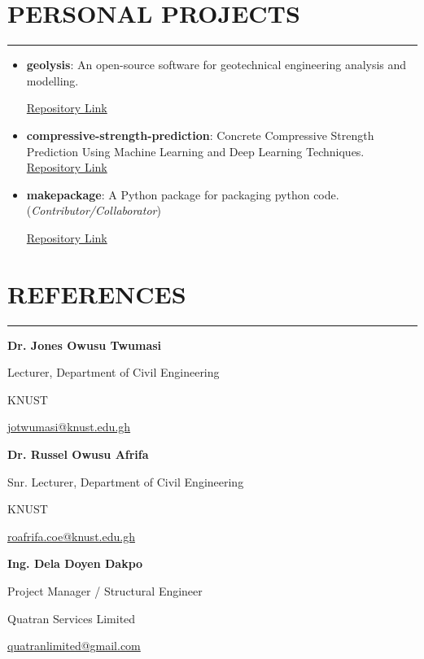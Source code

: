 \documentclass[letterpaper, 12pt]{article}
\newcommand{\cvsection}[1]{

	\section*{#1} \vspace*{-0.8cm}%
	\rule{\linewidth}{2pt}\par
}
\begin{document}

\cvsection{PERSONAL PROJECTS}

\begin{itemize}[leftmargin=*]

	\item \textbf{geolysis}: An open-source software for geotechnical engineering analysis and modelling. \par
	      \href{https://www.github.com/patrickboateng/geolysis}{Repository Link}

	\item \textbf{compressive-strength-prediction}: Concrete Compressive Strength Prediction Using Machine
	      Learning and Deep Learning Techniques.
	      \href{https://github.com/patrickboateng/compressive-strength-prediction}{Repository Link}

	\item \textbf{makepackage}: A Python package for packaging python code. (\textit{Contributor/Collaborator}) \par
	      \href{https://github.com/nyggus/makepackage/graphs/contributors}{Repository Link}

\end{itemize}


\cvsection{REFERENCES}


\begin{multicols}{2}

	\textbf{Dr. Jones Owusu Twumasi} \par
	Lecturer, Department of Civil Engineering \par
	KNUST \par
	\faEnvelopeSquare \space \href{mailto:jotwumasi@knust.edu.gh}{jotwumasi@knust.edu.gh} \par
	\faPhone {} \vspace*{0.5cm}

	\textbf{Dr. Russel Owusu Afrifa} \par
	Snr. Lecturer, Department of Civil Engineering \par
	KNUST \par
	\faEnvelopeSquare \space \href{mailto:roafrifa.coe@knust.edu.gh}{roafrifa.coe@knust.edu.gh} \par
	\faPhone {} \vspace*{0.5cm}

	\columnbreak

	\textbf{Ing. Dela Doyen Dakpo} \par
	Project Manager / Structural Engineer \par
	Quatran Services Limited \par
	\faEnvelopeSquare \space \href{mailto:quatranlimited@gmail.com}{quatranlimited@gmail.com} \par
	\faPhone {} \vspace*{0.5cm}

\end{multicols}
\end{document}
